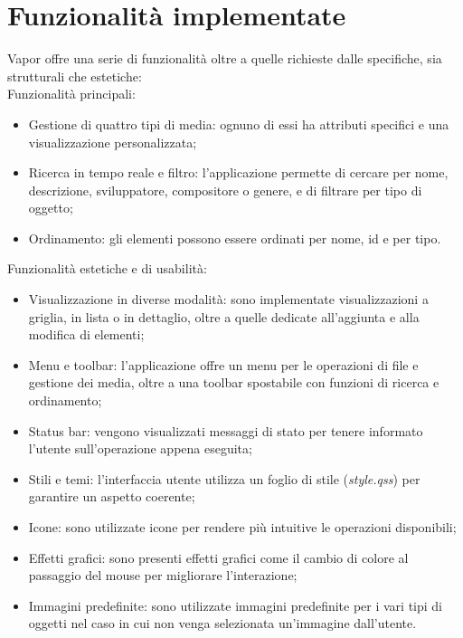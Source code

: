 \documentclass[10pt]{article}
\begin{document}
\section{Funzionalità implementate} \label{funzionalita}
Vapor offre una serie di funzionalità oltre a quelle richieste dalle specifiche, sia strutturali che estetiche:
\\Funzionalità principali:
\begin{itemize}
    \item Gestione di quattro tipi di media: ognuno di essi ha attributi specifici e una visualizzazione personalizzata;
    \item Ricerca in tempo reale e filtro: l'applicazione permette di cercare per nome, descrizione, sviluppatore, compositore o genere, e di filtrare per tipo di oggetto;
    \item Ordinamento: gli elementi possono essere ordinati per nome, id e per tipo.
\end{itemize}
Funzionalità estetiche e di usabilità:
\begin{itemize}
    \item Visualizzazione in diverse modalità: sono implementate visualizzazioni a griglia, in lista o in dettaglio, oltre a quelle dedicate all'aggiunta e alla modifica di elementi;
    \item Menu e toolbar: l'applicazione offre un menu per le operazioni di file e gestione dei media, oltre a una toolbar spostabile con funzioni di ricerca e ordinamento;
    \item Status bar: vengono visualizzati messaggi di stato per tenere informato l'utente sull'operazione appena eseguita;
    \item Stili e temi: l'interfaccia utente utilizza un foglio di stile (\textit{style.qss}) per garantire un aspetto coerente;
    \item Icone: sono utilizzate icone per rendere più intuitive le operazioni disponibili;
    \item Effetti grafici: sono presenti effetti grafici come il cambio di colore al passaggio del mouse per migliorare l'interazione;
    \item Immagini predefinite: sono utilizzate immagini predefinite per i vari tipi di oggetti nel caso in cui non venga selezionata un'immagine dall'utente.
\end{itemize}

\newpage
\end{document}
